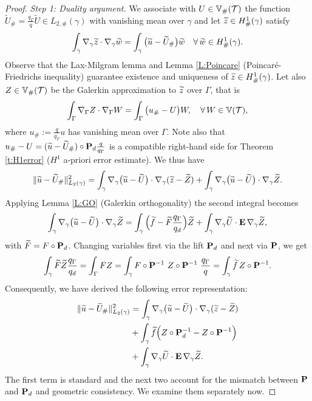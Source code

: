\begin{proof}
\medskip\noindent
{\it Step 1: Duality argument.}
We associate with $U\in\mathbb{V}_\#(\mathcal{T})$ the function $\widetilde{U}_\# = \frac{q_\Gamma}{q} \widetilde U \in L_{2,\#}(\gamma)$ with vanishing mean over $\gamma$ and let $\widetilde{z} \in H^1_\#(\gamma)$ satisfy
$$
\int_\gamma \nabla_\gamma \widetilde{z} \cdot \nabla_\gamma  \widetilde{w} = \int_\gamma \big(\widetilde{u} - \widetilde{U}_\#\big) \widetilde{w}
\quad \forall \, \widetilde{w} \in H^1_\#(\gamma).
$$
%
Observe that the Lax-Milgram lemma and Lemma \ref{L:Poincare} (Poincar\'e-Friedrichs inequality) guarantee existence and uniqueness of $\widetilde{z}\in H^1_\#(\gamma)$.
Let also $Z\in\mathbb{V}_\#(\mathcal{T})$ be the Galerkin approximation to $\widetilde{z}$ over $\Gamma$, that is
%
$$
\int_\Gamma \nabla_\Gamma Z \cdot \nabla_\Gamma W =
\int_\Gamma \big( u_\# - U \big) W, \quad \forall \, W \in \mathbb{V}(\mathcal{T}),
$$
%
where $u_\# := \frac{q}{q_\Gamma} u$
has vanishing mean over $\Gamma$. Note also that $u_\# - U=(\widetilde{u}-\widetilde{U}_\#)\circ{\bf P}_d \frac{q}{q_\Gamma}$ is a compatible right-hand side for Theorem \ref{t:H1error} ($H^1$
a-priori error estimate).
We thus have 
%
$$
\| \widetilde{u} - \widetilde{U}_\# \|_{L_2(\gamma)}^2  = 
\int_{\gamma} \nabla_\gamma \big(\widetilde{u}- \widetilde U \big) \cdot \nabla_\gamma (\widetilde{z}- \widetilde Z)
+  \int_{\gamma} \nabla_\gamma \big(\widetilde{u}- \widetilde U \big) \cdot \nabla_\gamma \widetilde Z.
$$
%
Applying Lemma \ref{L:GO} (Galerkin orthogonality) the second integral becomes
%
\[
\int_{\gamma} \nabla_\gamma \big(\widetilde{u}- \widetilde U\big) \cdot \nabla_\gamma \widetilde Z
= \int_\gamma \Big(\widetilde{f} - \widetilde F \frac{q_\Gamma}{q_d}  \Big) \widetilde Z
+ \int_\gamma \nabla_\gamma \widetilde U \cdot {\bf E} \, \nabla_\gamma \widetilde Z,
\]
%
with $\widetilde F = F\circ{\bf P}_d$. Changing variables first via the
lift ${\bf P}_d$ and next via ${\bf P}$, we get
%
\[
\int_\gamma \widetilde F \widetilde Z \frac{q_\Gamma}{q_d} = \int_\Gamma F Z
= \int_\gamma F\circ {\bf P}^{-1} ~ Z\circ{\bf P}^{-1} ~ \frac{q_\Gamma}{q} =\int_\gamma \widetilde{f} \, Z\circ{\bf P}^{-1}.
\]
%
Consequently, we have derived the following error representation:
%
\begin{equation}\label{error-rep}
\begin{aligned}
\| \widetilde{u} - \widetilde{U}_\# \|_{L_2(\gamma)}^2  &= 
\int_{\gamma} \nabla_\gamma \big(\widetilde{u}- \widetilde U \big) \cdot \nabla_\gamma (\widetilde{z}- \widetilde Z)
\\
& + \int_\gamma \widetilde{f} \Big( Z\circ{\bf P}_d^{-1} - Z \circ {\bf P}^{-1} \Big)
\\
& + \int_\gamma \nabla_\gamma \widetilde U \cdot {\bf E} \, \nabla_\gamma \widetilde Z.
\end{aligned}
\end{equation}
%
The first term is standard and the next two account for the mismatch between
${\bf P}$ and ${\bf P}_d$ and geometric consistency. We examine them separately now.


\end{proof}
